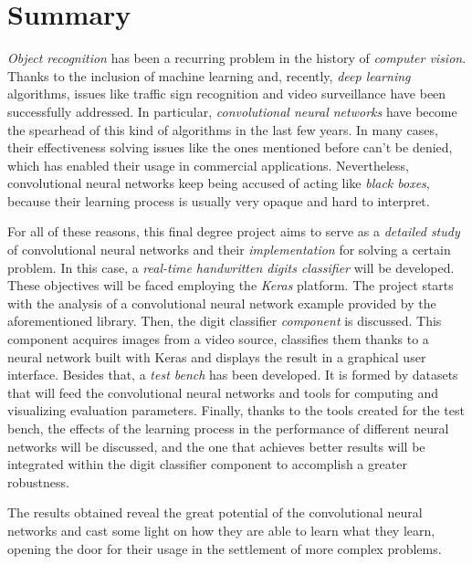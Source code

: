 \chapter*{Summary}
\emph{Object recognition} has been a recurring problem in the history of \emph{computer vision}. Thanks to the inclusion of machine learning and, recently, \emph{deep learning} algorithms, issues like traffic sign recognition and video surveillance have been successfully addressed. In particular, \emph{convolutional neural networks} have become the spearhead of this kind of algorithms in the last few years. In many cases, their effectiveness solving issues like the ones mentioned before can't be denied, which has enabled their usage in commercial applications. Nevertheless, convolutional neural networks keep being accused of acting like \emph{black boxes}, because their learning process is usually very opaque and hard to interpret.

For all of these reasons, this final degree project aims to serve as a \emph{detailed study} of convolutional neural networks and their \emph{implementation} for solving a certain problem. In this case, a \emph{real-time handwritten digits classifier} will be developed. These objectives will be faced employing the \emph{Keras} platform. The project starts with the analysis of a convolutional neural network example provided by the aforementioned library. Then, the digit classifier \emph{component} is discussed. This component acquires images from a video source, classifies them thanks to a neural network built with Keras and displays the result in a graphical user interface.  Besides that, a \emph{test bench} has been developed. It is formed by datasets that will feed the convolutional neural networks and tools for computing and visualizing evaluation parameters. Finally, thanks to the tools created for the test bench, the effects of the learning process in the performance of different neural networks will be discussed, and the one that achieves better results will be integrated within the digit classifier component to accomplish a greater robustness.

The results obtained reveal the great potential of the convolutional neural networks and cast some light on how they are able to learn what they learn, opening the door for their usage in the settlement of more complex problems.